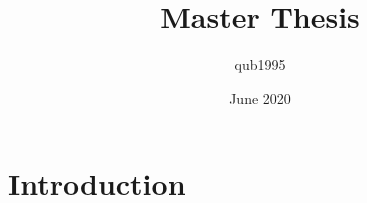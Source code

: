 \documentclass{article}
\title{Master Thesis}
\author{qub1995 }
\date{June 2020}
\begin{document}
\maketitle

\section{Introduction}
\end{document}
